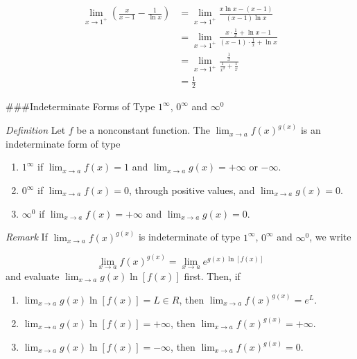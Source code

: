 \documentclass[
  letterpaper,
  DIV=11,
  numbers=noendperiod]{scrartcl}
\theoremstyle{definition}
\theoremstyle{plain}
\theoremstyle{remark}
\begin{document}
\[
\begin{aligned}
\displaystyle\lim_{x\to 1^+}{\left(\frac{x}{x-1}-\frac{1}{\ln x}\right)}&=\displaystyle\lim_{x\to 1^+}{\frac{x\ln x -(x-1)}{(x-1)\ln x}}\\&=\displaystyle\lim_{x\to 1^+}{\frac{x\cdot \frac{1}{x}+\ln x-1}{(x-1)\cdot \frac{1}{x}+\ln x}}\\&=\displaystyle\lim_{x\to 1^+}{\frac{\frac{1}{x}}{\frac{1}{x^2}+\frac{1}{x}}}\\&=\frac{1}{2}
\end{aligned}
\]

\#\#\#Indeterminate Forms of Type \(1^\infty\), \(0^\infty\) and
\(\infty ^0\)

\leavevmode{}%
\emph{Definition} Let \(f\) be a nonconstant function. The
\(\displaystyle\lim_{x\to a}{f(x)^{g(x)}}\) is an indeterminate form of
type

\begin{enumerate}
\def\labelenumi{\arabic{enumi}.}
\item
  \(1^\infty\) if \(\displaystyle\lim_{x\to a}{f(x)=1}\) and
  \(\displaystyle\lim_{x\to a}{g(x)=+\infty}\) or \(-\infty\).
\item
  \(0^\infty\) if \(\displaystyle\lim_{x\to a}{f(x)=0}\), through
  positive values, and \(\displaystyle\lim_{x\to a}{g(x)=0}\).
\item
  \(\infty ^0\) if \(\displaystyle\lim_{x\to a}{f(x)=+\infty}\) and
  \(\displaystyle\lim_{x\to a}{g(x)=0}\).
\end{enumerate}

\leavevmode{}%
\emph{Remark} If \(\displaystyle\lim_{x\to a}{f(x)^{g(x)}}\) is
indeterminate of type \(1^\infty\), \(0^\infty\) and \(\infty ^0\), we
write

\[
\displaystyle\lim_{x\to a}{f(x)^{g(x)}}=\displaystyle\lim_{x\to a}{e^{g(x) \ln [f(x)]}}
\] and evaluate \(\displaystyle\lim_{x\to a}{g(x) \ln [f(x)]}\) first.
Then, if

\begin{enumerate}
\def\labelenumi{\arabic{enumi}.}
\item
  \(\displaystyle\lim_{x\to a}{g(x) \ln [f(x)]}=L \in R\), then
  \(\displaystyle\lim_{x\to a}{f(x)^{g(x)}}=e^L\).
\item
  \(\displaystyle\lim_{x\to a}{g(x) \ln [f(x)]}=+\infty\), then
  \(\displaystyle\lim_{x\to a}{f(x)^{g(x)}}=+\infty\).
\item
  \(\displaystyle\lim_{x\to a}{g(x) \ln [f(x)]}=-\infty\), then
  \(\displaystyle\lim_{x\to a}{f(x)^{g(x)}}=0\).
\end{enumerate}
\end{document}
